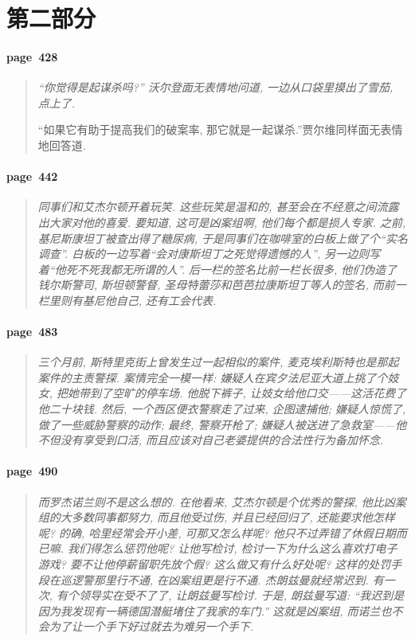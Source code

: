 \section{第二部分}

\paragraph*{page~428}
\begin{quotation}
    \itshape
    ``你觉得是起谋杀吗?'' 沃尔登面无表情地问道, 一边从口袋里摸出了雪茄, 点上了. 

    ``如果它有助于提高我们的破案率, 那它就是一起谋杀.''贾尔维同样面无表情地回答道. 
\end{quotation}

\paragraph*{page~442}
\begin{quotation}
    \itshape
    同事们和艾杰尔顿开着玩笑. 这些玩笑是温和的, 甚至会在不经意之间流露出大家对他的喜爱. 要知道, 这可是凶案组啊, 他们每个都是损人专家. 之前, 基尼斯康坦丁被查出得了糖尿病, 于是同事们在咖啡室的白板上做了个``实名调查''. 白板的一边写着``会对康斯坦丁之死觉得遗憾的人'', 另一边则写着``他死不死我都无所谓的人''. 后一栏的签名比前一栏长很多, 他们伪造了钱尔斯警司, 斯坦顿警督, 圣母特蕾莎和芭芭拉康斯坦丁等人的签名, 而前一栏里则有基尼他自己, 还有工会代表. 
\end{quotation}

\paragraph*{page~483}
\begin{quotation}
    \itshape
    三个月前, 斯特里克街上曾发生过一起相似的案件, 麦克埃利斯特也是那起案件的主责警探. 案情完全一模一样: 嫌疑人在宾夕法尼亚大道上挑了个妓女, 把她带到了空旷的停车场. 他脱下裤子, 让妓女给他口交------这活花费了他二十块钱. 然后, 一个西区便衣警察走了过来, 企图逮捕他; 嫌疑人惊慌了, 做了一些威胁警察的动作; 最终, 警察开枪了; 嫌疑人被送进了急救室------他不但没有享受到口活, 而且应该对自己老婆提供的合法性行为备加怀念. 
\end{quotation}

\paragraph*{page~490}
\begin{quotation}
    \itshape
    而罗杰诺兰则不是这么想的. 在他看来, 艾杰尔顿是个优秀的警探, 他比凶案组的大多数同事都努力, 而且他受过伤, 并且已经回归了, 还能要求他怎样呢? 的确, 哈里经常会开小差, 可那又怎么样呢? 他只不过弄错了休假日期而已嘛. 我们得怎么惩罚他呢? 让他写检讨, 检讨一下为什么这么喜欢打电子游戏? 要不让他停薪留职先放个假? 这么做又有什么好处呢? 这样的处罚手段在巡逻警那里行不通, 在凶案组更是行不通. 杰朗兹曼就经常迟到. 有一次, 有个领导实在受不了了, 让朗兹曼写检讨. 于是, 朗兹曼写道: ``我迟到是因为我发现有一辆德国潜艇堵住了我家的车门.'' 这就是凶案组, 而诺兰也不会为了让一个手下好过就去为难另一个手下. 
\end{quotation}

